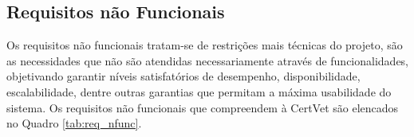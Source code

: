 \documentclass[
    12pt,               %
    openright,          %
    oneside,
    a4paper,            %
    BIBLATEX,           %
    TODO,               %
    english,            %
    brazil              %
    ]{ifsp-spo-inf-ctds}
\providecommand{\DIFdelend}{} %
\DeclareRobustCommand{\DIFdelend}{\DIFOaddend \let\includegraphics\DIFOincludegraphics} %
\begin{document}
\DIFdelend %
        \subsection{Requisitos não Funcionais}

            Os requisitos não funcionais tratam-se de restrições mais técnicas do projeto, são as necessidades que não são atendidas necessariamente através de funcionalidades, objetivando garantir níveis satisfatórios  de desempenho, disponibilidade, escalabilidade, dentre outras garantias que permitam a máxima usabilidade do sistema. Os requisitos não funcionais que compreendem à CertVet são elencados no Quadro \ref{tab:req_nfunc}.
\end{document}
